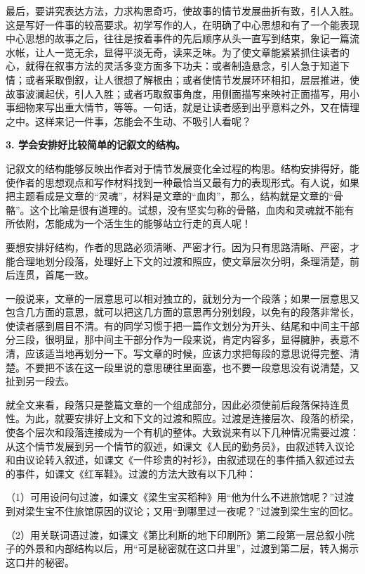 最后，要讲究表达方法，力求构思奇巧，使故事的情节发展曲折有致，引人入胜。这是写好一件事的较高要求。初学写作的人，在明确了中心思想和有了一个能表现中心思想的故事之后，往往是按着事件的先后顺序从头一直写到结束，象记一篇流水帐，让人一览无余，显得平淡无奇，读来乏味。为了使文章能紧紧抓住读者的心，就得在叙事方法的灵活多变方面多下功夫：或者制造悬念，引人急于知道下情；或者采取倒叙，让人很想了解根由；或者使情节发展环环相扣，层层推进，使故事波澜起伏，引人入胜；或者巧取叙事角度，用侧面描写来映衬正面描写，用小事细物来写出重大情节，等等。一句话，就是让读者感到出乎意料之外，又在情理之中。这样来记一件事，怎能会不生动、不吸引人看呢？

\textbf{3. 学会安排好比较简单的记叙文的结构。}

记叙文的结构能够反映出作者对于情节发展变化全过程的构思。结构安排得好，能使作者的思想观点和写作材料找到一种最恰当又最有力的表现形式。有人说，如果把主题看成是文章的“灵魂”，材料是文章的“血肉”，那么，结构就是文章的“骨骼”。这个比喻是很有道理的。试想，没有坚实匀称的骨骼，血肉和灵魂就不能有所依附，怎能成为一个活生生的能够站立行走的真人呢！

要想安排好结构，作者的思路必须清晰、严密才行。因为只有思路清晰、严密，才能合理地划分段落，处理好上下文的过渡和照应，使文章层次分明，条理清楚，前后连贯，首尾一致。

一般说来，文章的一层意思可以相对独立的，就划分为一个段落；如果一层意思又包含几方面的意思，就可以把这几方面的意思再分别划段，以免有的段落非常长，使读者感到眉目不清。有的同学习惯于把一篇作文划分为开头、结尾和中间主干部分三段，很明显，那中间主干部分作为一段来说，肯定内容多，显得臃肿，表意不清，应该适当地再划分一下。写文章的时候，应该力求把每段的意思说得完整、清楚。不要把不该在这一段里说的意思硬往里面塞，也不要一段意思没有说清楚，又扯到另一段去。

就全文来看，段落只是整篇文章的一个组成部分，因此必须使前后段落保持连贯性。为此，就要安排好上文和下文的过渡和照应。过渡是连接层次、段落的桥梁，使各个层次和段落连接成为一个有机的整体。大致说来有以下几种情况需要过渡：从这个情节发展到另一个情节的叙述，如课文《人民的勤务员》，由叙述转入议论和由议论转入叙述，如课文《一件珍贵的衬衫》，由叙述现在的事件插入叙述过去的事件，如课文《红军鞋》。过渡的方法大致有以下几种：

（1）可用设问句过渡，如课文《梁生宝买稻种》用“他为什么不进旅馆呢？”过渡到对梁生宝不住旅馆原因的议论；又用“到哪里过一夜呢？”过渡到梁生宝的回忆。

（2）用关联词语过渡，如课文《第比利斯的地下印刷所》第二段第一层总叙小院子的外景和内部结构以后，用“可是秘密就在这口井里”，过渡到第二层，转入揭示这口井的秘密。

